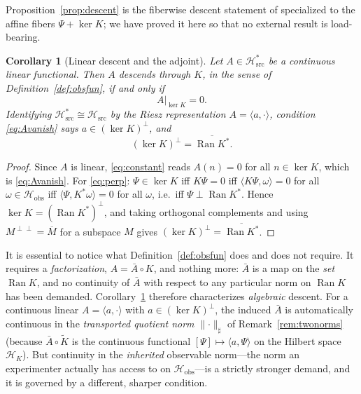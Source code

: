 \documentclass[11pt,reqno]{amsart}
\numberwithin{equation}{section}
\theoremstyle{plain}
\newtheorem{corollary}[theorem]{Corollary}
\theoremstyle{definition}
\theoremstyle{remark}
\newcommand{\Hsrc}{\mathcal{H}_{\mathrm{src}}}
\newcommand{\Hobs}{\mathcal{H}_{\mathrm{obs}}}
\newcommand{\HK}{\mathcal{H}_{K}}
\newcommand{\Ran}{\operatorname{Ran}}
\newcommand{\Kt}{\widetilde{K}}
\newcommand{\inner}[2]{\langle #1 , #2 \rangle}
\begin{document}
Proposition~\ref{prop:descent} is the fiberwise descent statement of \cite{Paper1}
specialized to the affine fibers $\Psi+\ker K$; we have proved it here so that no external
result is load-bearing.

\begin{corollary}[Linear descent and the adjoint]
\label{cor:lindescent}
Let $A\in\Hsrc^{*}$ be a continuous linear functional. Then $A$ descends through $K$, in the
sense of Definition~\ref{def:obsfun}, if and only if
\begin{equation}
\label{eq:Avanish}
A|_{\ker K}=0 .
\end{equation}
Identifying $\Hsrc^{*}\cong\Hsrc$ by the Riesz representation $A=\inner{a}{\cdot}$, condition
\eqref{eq:Avanish} says $a\in(\ker K)^{\perp}$, and
\begin{equation}
\label{eq:perp}
(\ker K)^{\perp}=\overline{\Ran K^{*}} .
\end{equation}
\end{corollary}

\begin{proof}
Since $A$ is linear, \eqref{eq:constant} reads $A(n)=0$ for all $n\in\ker K$, which is
\eqref{eq:Avanish}. For \eqref{eq:perp}: $\Psi\in\ker K$ iff $K\Psi=0$ iff
$\inner{K\Psi}{\omega}=0$ for all $\omega\in\Hobs$ iff $\inner{\Psi}{K^{*}\omega}=0$ for all
$\omega$, i.e.\ iff $\Psi\perp\Ran K^{*}$. Hence $\ker K=(\Ran K^{*})^{\perp}$, and taking
orthogonal complements and using $M^{\perp\perp}=\overline{M}$ for a subspace $M$ gives
$(\ker K)^{\perp}=\overline{\Ran K^{*}}$.
\end{proof}

It is essential to notice what Definition~\ref{def:obsfun} does and does not require. It
requires a \emph{factorization}, $A=\bar A\circ K$, and nothing more: $\bar A$ is a map on the
\emph{set} $\Ran K$, and no continuity of $\bar A$ with respect to any particular norm on
$\Ran K$ has been demanded. Corollary~\ref{cor:lindescent} therefore characterizes
\emph{algebraic} descent. For a continuous linear $A=\inner{a}{\cdot}$ with
$a\in(\ker K)^{\perp}$, the induced $\bar A$ is automatically continuous in the
\emph{transported quotient norm} $\lVert\cdot\rVert_{\sharp}$ of Remark~\ref{rem:twonorms}
(because $\bar A\circ\Kt$ is the continuous functional $[\Psi]\mapsto\inner{a}{\Psi}$ on the
Hilbert space $\HK$). But continuity in the \emph{inherited} observable norm---the norm an
experimenter actually has access to on $\Hobs$---is a strictly stronger demand, and it is
governed by a different, sharper condition.
\end{document}
